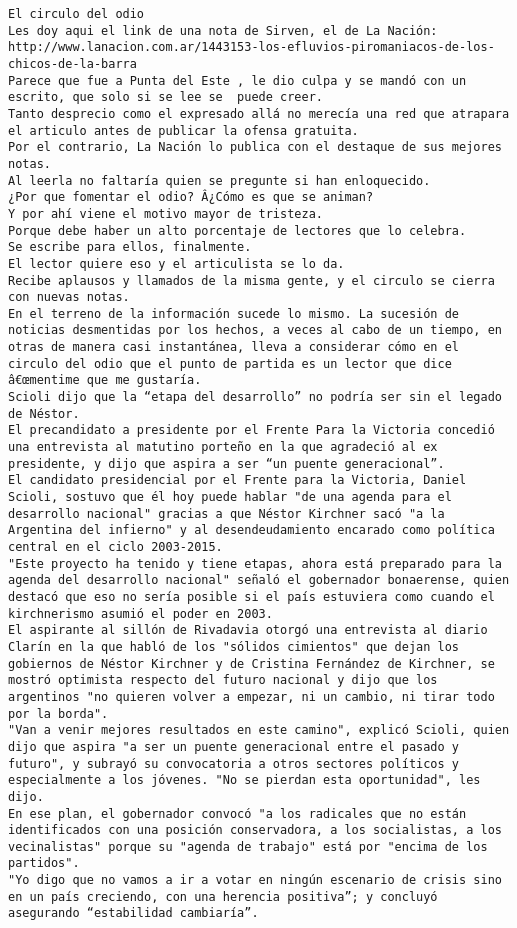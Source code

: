 \documentclass[11pt]{article}
\begin{document}
\begin{Verbatim}[commandchars=\\\{\}]
﻿El circulo del odio
Les doy aqui el link de una nota de Sirven, el de La Nación:
http://www.lanacion.com.ar/1443153-los-efluvios-piromaniacos-de-los-chicos-de-la-barra
Parece que fue a Punta del Este , le dio culpa y se mandó con un escrito, que solo si se lee se  puede creer.
Tanto desprecio como el expresado allá no merecía una red que atrapara el articulo antes de publicar la ofensa gratuita.
Por el contrario, La Nación lo publica con el destaque de sus mejores notas.
Al leerla no faltaría quien se pregunte si han enloquecido.
¿Por que fomentar el odio? Â¿Cómo es que se animan?
Y por ahí viene el motivo mayor de tristeza.
Porque debe haber un alto porcentaje de lectores que lo celebra.
Se escribe para ellos, finalmente.
El lector quiere eso y el articulista se lo da.
Recibe aplausos y llamados de la misma gente, y el circulo se cierra con nuevas notas.
En el terreno de la información sucede lo mismo. La sucesión de noticias desmentidas por los hechos, a veces al cabo de un tiempo, en otras de manera casi instantánea, lleva a considerar cómo en el circulo del odio que el punto de partida es un lector que dice â€œmentime que me gustaría.
﻿Scioli dijo que la “etapa del desarrollo” no podría ser sin el legado de Néstor.
El precandidato a presidente por el Frente Para la Victoria concedió una entrevista al matutino porteño en la que agradeció al ex presidente, y dijo que aspira a ser “un puente generacional”.
El candidato presidencial por el Frente para la Victoria, Daniel Scioli, sostuvo que él hoy puede hablar "de una agenda para el desarrollo nacional" gracias a que Néstor Kirchner sacó "a la Argentina del infierno" y al desendeudamiento encarado como política central en el ciclo 2003-2015.
"Este proyecto ha tenido y tiene etapas, ahora está preparado para la agenda del desarrollo nacional" señaló el gobernador bonaerense, quien destacó que eso no sería posible si el país estuviera como cuando el kirchnerismo asumió el poder en 2003.
El aspirante al sillón de Rivadavia otorgó una entrevista al diario Clarín en la que habló de los "sólidos cimientos" que dejan los gobiernos de Néstor Kirchner y de Cristina Fernández de Kirchner, se mostró optimista respecto del futuro nacional y dijo que los argentinos "no quieren volver a empezar, ni un cambio, ni tirar todo por la borda".
"Van a venir mejores resultados en este camino", explicó Scioli, quien dijo que aspira "a ser un puente generacional entre el pasado y futuro", y subrayó su convocatoria a otros sectores políticos y especialmente a los jóvenes. "No se pierdan esta oportunidad", les dijo.
En ese plan, el gobernador convocó "a los radicales que no están identificados con una posición conservadora, a los socialistas, a los vecinalistas" porque su "agenda de trabajo" está por "encima de los partidos".
"Yo digo que no vamos a ir a votar en ningún escenario de crisis sino en un país creciendo, con una herencia positiva”; y concluyó asegurando “estabilidad cambiaría”.

    \end{Verbatim}
\end{document}
